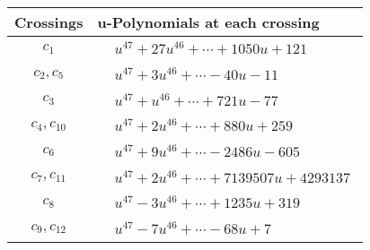 \documentclass[1p]{elsarticle_modified}
\theoremstyle{definition}
\begin{document}
\begin{tabular}{m{50pt}|m{274pt}}
Crossings & \hspace{64pt}u-Polynomials at each crossing \\
\hline $$\begin{aligned}c_{1}\end{aligned}$$&$\begin{aligned}
&u^{47}+27 u^{46}+\cdots+1050 u+121
\end{aligned}$\\
\hline $$\begin{aligned}c_{2},c_{5}\end{aligned}$$&$\begin{aligned}
&u^{47}+3 u^{46}+\cdots-40 u-11
\end{aligned}$\\
\hline $$\begin{aligned}c_{3}\end{aligned}$$&$\begin{aligned}
&u^{47}+u^{46}+\cdots+721 u-77
\end{aligned}$\\
\hline $$\begin{aligned}c_{4},c_{10}\end{aligned}$$&$\begin{aligned}
&u^{47}+2 u^{46}+\cdots+880 u+259
\end{aligned}$\\
\hline $$\begin{aligned}c_{6}\end{aligned}$$&$\begin{aligned}
&u^{47}+9 u^{46}+\cdots-2486 u-605
\end{aligned}$\\
\hline $$\begin{aligned}c_{7},c_{11}\end{aligned}$$&$\begin{aligned}
&u^{47}+2 u^{46}+\cdots+7139507 u+4293137
\end{aligned}$\\
\hline $$\begin{aligned}c_{8}\end{aligned}$$&$\begin{aligned}
&u^{47}-3 u^{46}+\cdots+1235 u+319
\end{aligned}$\\
\hline $$\begin{aligned}c_{9},c_{12}\end{aligned}$$&$\begin{aligned}
&u^{47}-7 u^{46}+\cdots-68 u+7
\end{aligned}$\\
\hline
\end{tabular}\\~\\
\end{document}
